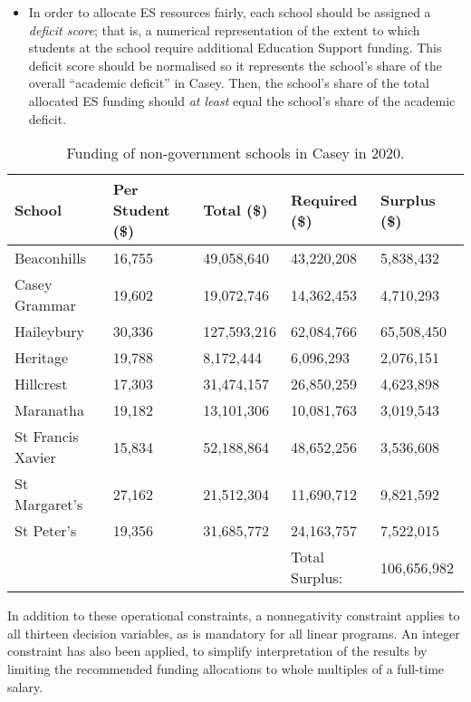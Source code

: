 \documentclass[11pt, a4paper]{article}
\begin{document}
\begin{itemize}
        \item In order to allocate ES resources fairly, each school should be assigned a \textit{deficit score}; that is, a numerical representation of the extent to which students at the school require additional Education Support funding. This deficit score should be normalised so it represents the school's share of the overall ``academic deficit'' in Casey. Then, the school's share of the total allocated ES funding should \textit{at least} equal the school's share of the academic deficit.
    \end{itemize}

    \begin{table}[!ht]
        \centering
        \caption{Funding of non-government schools in Casey in 2020.}
        \begin{tabular}{|l|l|l|l|l|}
        \hline
            School & Per Student (\$) & Total (\$) & Required (\$)  & Surplus (\$)  \\ \hline
            Beaconhills & 16,755 & 49,058,640 & 43,220,208 & 5,838,432  \\ \hline
            Casey Grammar & 19,602 & 19,072,746 & 14,362,453 & 4,710,293  \\ \hline
            Haileybury & 30,336 & 127,593,216 & 62,084,766 & 65,508,450  \\ \hline
            Heritage & 19,788 & 8,172,444 & 6,096,293 & 2,076,151  \\ \hline
            Hillcrest & 17,303 & 31,474,157 & 26,850,259 & 4,623,898  \\ \hline
            Maranatha & 19,182 & 13,101,306 & 10,081,763 & 3,019,543  \\ \hline
            St Francis Xavier & 15,834 & 52,188,864 & 48,652,256 & 3,536,608  \\ \hline
            St Margaret's & 27,162 & 21,512,304 & 11,690,712 & 9,821,592  \\ \hline
            St Peter's & 19,356 & 31,685,772 & 24,163,757 & 7,522,015  \\ \hline
            ~ & ~ & ~ & Total Surplus: & 106,656,982  \\ \hline
        \end{tabular}
        \label{private_funding}
    \end{table}

    In addition to these operational constraints, a nonnegativity constraint applies to all thirteen decision variables, as is mandatory for all linear programs. An integer constraint has also been applied, to simplify interpretation of the results by limiting the recommended funding allocations to whole multiples of a full-time salary. 
\end{document}

